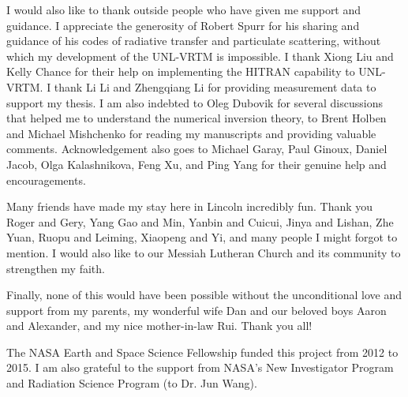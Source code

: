 \begin{acknowledgments}
I would also like to thank outside people who have given me support and 
guidance. I appreciate the generosity of Robert Spurr for his sharing
and guidance of his codes of radiative transfer and particulate
scattering, without which my development of the UNL-VRTM is impossible.
I thank Xiong Liu and Kelly Chance for their help on implementing the HITRAN
capability to UNL-VRTM. I thank Li Li and Zhengqiang Li for providing
measurement data to support my thesis. I am also indebted to Oleg
Dubovik for several discussions that helped me to understand the
numerical inversion theory, to Brent Holben and Michael Mishchenko for
reading my manuscripts and providing valuable comments. Acknowledgement
also goes to Michael Garay, Paul Ginoux, Daniel Jacob, Olga Kalashnikova, 
Feng Xu, and Ping Yang for their genuine help and encouragements. 

Many friends have made my stay here in Lincoln incredibly fun. Thank you
Roger and Gery, Yang Gao and Min, Yanbin and Cuicui, Jinya and Lishan, 
Zhe Yuan, Ruopu and Leiming, Xiaopeng and Yi, and many people I might
forgot to mention. I would also like to our Messiah Lutheran Church and
its community to strengthen my faith. 

Finally, none of this would have been possible without the unconditional
love and support from my parents, my wonderful wife Dan and our beloved boys 
Aaron and Alexander, and my nice mother-in-law Rui. Thank you all!  

\end{acknowledgments}

\begin{grantinfo}
  The NASA Earth and Space Science Fellowship funded this project from
  2012 to 2015. I am also grateful to the support
  from NASA's New Investigator Program and Radiation Science Program
  (to Dr. Jun Wang).
\end{grantinfo}

